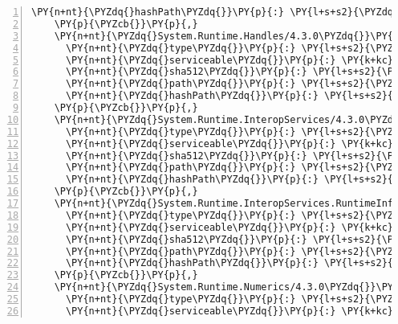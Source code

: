 \begin{Verbatim}[commandchars=\\\{\},numbers=left,firstnumber=1,stepnumber=1,numberblanklines=0]
      \PY{n+nt}{\PYZdq{}hashPath\PYZdq{}}\PY{p}{:} \PY{l+s+s2}{\PYZdq{}system.runtime.extensions.4.3.0.nupkg.sha512\PYZdq{}}
    \PY{p}{\PYZcb{}}\PY{p}{,}
    \PY{n+nt}{\PYZdq{}System.Runtime.Handles/4.3.0\PYZdq{}}\PY{p}{:} \PY{p}{\PYZob{}}
      \PY{n+nt}{\PYZdq{}type\PYZdq{}}\PY{p}{:} \PY{l+s+s2}{\PYZdq{}package\PYZdq{}}\PY{p}{,}
      \PY{n+nt}{\PYZdq{}serviceable\PYZdq{}}\PY{p}{:} \PY{k+kc}{true}\PY{p}{,}
      \PY{n+nt}{\PYZdq{}sha512\PYZdq{}}\PY{p}{:} \PY{l+s+s2}{\PYZdq{}sha512\PYZhy{}OKiSUN7DmTWeYb3l51A7EYaeNMnvxwE249YtZz7yooT4gOZhmTjIn48KgSsw2k2lYdLgTKNJw/ZIfSElwDRVgg==\PYZdq{}}\PY{p}{,}
      \PY{n+nt}{\PYZdq{}path\PYZdq{}}\PY{p}{:} \PY{l+s+s2}{\PYZdq{}system.runtime.handles/4.3.0\PYZdq{}}\PY{p}{,}
      \PY{n+nt}{\PYZdq{}hashPath\PYZdq{}}\PY{p}{:} \PY{l+s+s2}{\PYZdq{}system.runtime.handles.4.3.0.nupkg.sha512\PYZdq{}}
    \PY{p}{\PYZcb{}}\PY{p}{,}
    \PY{n+nt}{\PYZdq{}System.Runtime.InteropServices/4.3.0\PYZdq{}}\PY{p}{:} \PY{p}{\PYZob{}}
      \PY{n+nt}{\PYZdq{}type\PYZdq{}}\PY{p}{:} \PY{l+s+s2}{\PYZdq{}package\PYZdq{}}\PY{p}{,}
      \PY{n+nt}{\PYZdq{}serviceable\PYZdq{}}\PY{p}{:} \PY{k+kc}{true}\PY{p}{,}
      \PY{n+nt}{\PYZdq{}sha512\PYZdq{}}\PY{p}{:} \PY{l+s+s2}{\PYZdq{}sha512\PYZhy{}uv1ynXqiMK8mp1GM3jDqPCFN66eJ5w5XNomaK2XD+TuCroNTLFGeZ+WCmBMcBDyTFKou3P6cR6J/QsaqDp7fGQ==\PYZdq{}}\PY{p}{,}
      \PY{n+nt}{\PYZdq{}path\PYZdq{}}\PY{p}{:} \PY{l+s+s2}{\PYZdq{}system.runtime.interopservices/4.3.0\PYZdq{}}\PY{p}{,}
      \PY{n+nt}{\PYZdq{}hashPath\PYZdq{}}\PY{p}{:} \PY{l+s+s2}{\PYZdq{}system.runtime.interopservices.4.3.0.nupkg.sha512\PYZdq{}}
    \PY{p}{\PYZcb{}}\PY{p}{,}
    \PY{n+nt}{\PYZdq{}System.Runtime.InteropServices.RuntimeInformation/4.3.0\PYZdq{}}\PY{p}{:} \PY{p}{\PYZob{}}
      \PY{n+nt}{\PYZdq{}type\PYZdq{}}\PY{p}{:} \PY{l+s+s2}{\PYZdq{}package\PYZdq{}}\PY{p}{,}
      \PY{n+nt}{\PYZdq{}serviceable\PYZdq{}}\PY{p}{:} \PY{k+kc}{true}\PY{p}{,}
      \PY{n+nt}{\PYZdq{}sha512\PYZdq{}}\PY{p}{:} \PY{l+s+s2}{\PYZdq{}sha512\PYZhy{}cbz4YJMqRDR7oLeMRbdYv7mYzc++17lNhScCX0goO2XpGWdvAt60CGN+FHdePUEHCe/Jy9jUlvNAiNdM+7jsOw==\PYZdq{}}\PY{p}{,}
      \PY{n+nt}{\PYZdq{}path\PYZdq{}}\PY{p}{:} \PY{l+s+s2}{\PYZdq{}system.runtime.interopservices.runtimeinformation/4.3.0\PYZdq{}}\PY{p}{,}
      \PY{n+nt}{\PYZdq{}hashPath\PYZdq{}}\PY{p}{:} \PY{l+s+s2}{\PYZdq{}system.runtime.interopservices.runtimeinformation.4.3.0.nupkg.sha512\PYZdq{}}
    \PY{p}{\PYZcb{}}\PY{p}{,}
    \PY{n+nt}{\PYZdq{}System.Runtime.Numerics/4.3.0\PYZdq{}}\PY{p}{:} \PY{p}{\PYZob{}}
      \PY{n+nt}{\PYZdq{}type\PYZdq{}}\PY{p}{:} \PY{l+s+s2}{\PYZdq{}package\PYZdq{}}\PY{p}{,}
      \PY{n+nt}{\PYZdq{}serviceable\PYZdq{}}\PY{p}{:} \PY{k+kc}{true}\PY{p}{,}

\end{Verbatim}
